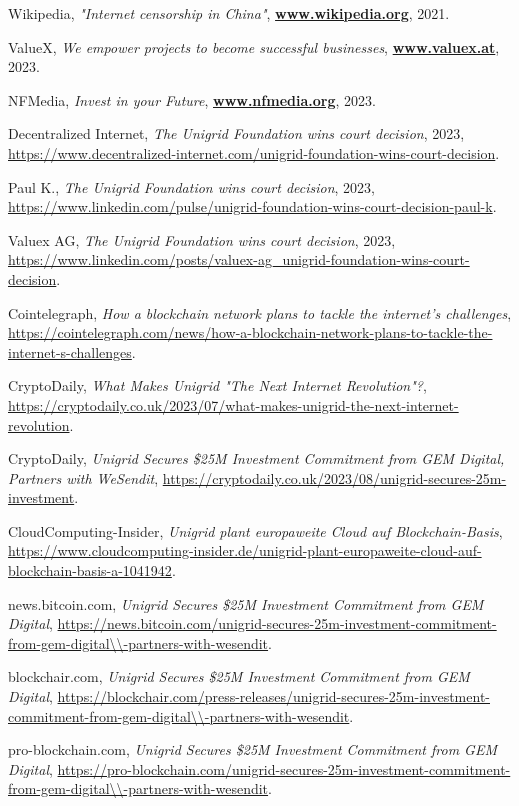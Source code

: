 \documentclass[a4paper,oneside]{article}
\let\oldhref\href
\renewcommand{\href}[2]{\oldhref{#1}{\bfseries#2}}
\begin{document}
\begin{thebibliography}{999}
    Wikipedia,
    \emph{"Internet censorship in China"},
    \href{https://www.wikipedia.org/wiki/Internet_censorship_in_China}{www.wikipedia.org},
    2021.

	ValueX,
	\emph{We empower projects to become successful businesses},
	\href{https://www.valuex.at}{www.valuex.at},
	2023.

	NFMedia,
	\emph{Invest in your Future},
	\href{https://www.nfmedia.org}{www.nfmedia.org},
	2023.

	Decentralized Internet,
	\emph{The Unigrid Foundation wins court decision},
	2023,
	\url{https://www.decentralized-internet.com/unigrid-foundation-wins-court-decision}.

	Paul K.,
	\emph{The Unigrid Foundation wins court decision},
	2023,
	\url{https://www.linkedin.com/pulse/unigrid-foundation-wins-court-decision-paul-k}.

	Valuex AG,
	\emph{The Unigrid Foundation wins court decision},
	2023,
	\url{https://www.linkedin.com/posts/valuex-ag_unigrid-foundation-wins-court-decision}.


	Cointelegraph,
	\emph{How a blockchain network plans to tackle the internet's challenges},
	\url{https://cointelegraph.com/news/how-a-blockchain-network-plans-to-tackle-the-internet-s-challenges}.

	CryptoDaily,
	\emph{What Makes Unigrid "The Next Internet Revolution"?},
	\url{https://cryptodaily.co.uk/2023/07/what-makes-unigrid-the-next-internet-revolution}.

	CryptoDaily,
	\emph{Unigrid Secures \$25M Investment Commitment from GEM Digital, Partners with WeSendit},
	\url{https://cryptodaily.co.uk/2023/08/unigrid-secures-25m-investment}.

	CloudComputing-Insider,
	\emph{Unigrid plant europaweite Cloud auf Blockchain-Basis},
	\url{https://www.cloudcomputing-insider.de/unigrid-plant-europaweite-cloud-auf-blockchain-basis-a-1041942}.

	news.bitcoin.com,
	\emph{Unigrid Secures \$25M Investment Commitment from GEM Digital},
	\url{https://news.bitcoin.com/unigrid-secures-25m-investment-commitment-from-gem-digital\\-partners-with-wesendit}.

	blockchair.com,
	\emph{Unigrid Secures \$25M Investment Commitment from GEM Digital},
	\url{https://blockchair.com/press-releases/unigrid-secures-25m-investment-commitment-from-gem-digital\\-partners-with-wesendit}.

	pro-blockchain.com,
	\emph{Unigrid Secures \$25M Investment Commitment from GEM Digital},
	\url{https://pro-blockchain.com/unigrid-secures-25m-investment-commitment-from-gem-digital\\-partners-with-wesendit}.

\end{thebibliography}
\end{document}
